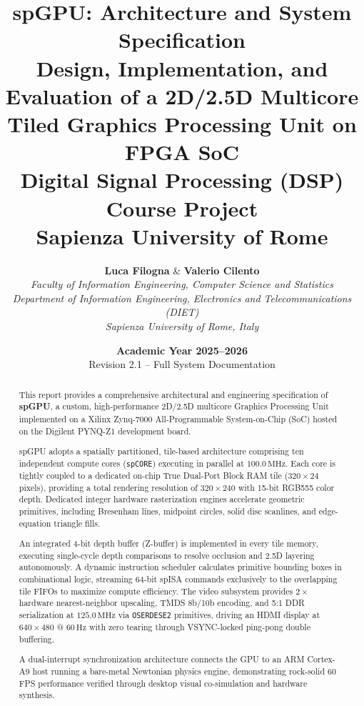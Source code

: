 \documentclass[11pt, a4paper, oneside]{report}
\title{
    \vspace{-2.0cm}
    \Huge\textbf{\color{primary}spGPU: Architecture and System Specification}\\[0.4cm]
    \LARGE\textbf{Design, Implementation, and Evaluation of a 2D/2.5D Multicore Tiled Graphics Processing Unit on FPGA SoC}\\[0.8cm]
    \large Digital Signal Processing (DSP) Course Project\\
    Sapienza University of Rome
}
\author{
    \textbf{Luca Filogna} \quad \& \quad \textbf{Valerio Cilento}\\[0.2cm]
    \textit{Faculty of Information Engineering, Computer Science and Statistics}\\
    \textit{Department of Information Engineering, Electronics and Telecommunications (DIET)}\\
    \textit{Sapienza University of Rome, Italy}
}
\date{\textbf{Academic Year 2025--2026}\\[0.4cm] \small Revision 2.1 -- Full System Documentation}
\begin{document}
\maketitle

\begin{abstract}
This report provides a comprehensive architectural and engineering specification of \textbf{spGPU}, a custom, high-performance 2D/2.5D multicore Graphics Processing Unit implemented on a Xilinx Zynq-7000 All-Programmable System-on-Chip (SoC) hosted on the Digilent PYNQ-Z1 development board. 

spGPU adopts a spatially partitioned, tile-based architecture comprising ten independent compute cores (\texttt{spCORE}) executing in parallel at $100.0\,\text{MHz}$. Each core is tightly coupled to a dedicated on-chip True Dual-Port Block RAM tile ($320 \times 24$ pixels), providing a total rendering resolution of $320 \times 240$ with 15-bit RGB555 color depth. Dedicated integer hardware rasterization engines accelerate geometric primitives, including Bresenham lines, midpoint circles, solid disc scanlines, and edge-equation triangle fills.

An integrated 4-bit depth buffer (Z-buffer) is implemented in every tile memory, executing single-cycle depth comparisons to resolve occlusion and 2.5D layering autonomously. A dynamic instruction scheduler calculates primitive bounding boxes in combinational logic, streaming 64-bit spISA commands exclusively to the overlapping tile FIFOs to maximize compute efficiency. The video subsystem provides $2\times$ hardware nearest-neighbor upscaling, TMDS 8b/10b encoding, and 5:1 DDR serialization at $125.0\,\text{MHz}$ via \texttt{OSERDESE2} primitives, driving an HDMI display at $640 \times 480$ @ $60\,\text{Hz}$ with zero tearing through VSYNC-locked ping-pong double buffering. 

A dual-interrupt synchronization architecture connects the GPU to an ARM Cortex-A9 host running a bare-metal Newtonian physics engine, demonstrating rock-solid 60 FPS performance verified through desktop visual co-simulation and hardware synthesis.
\end{abstract}

\tableofcontents
\listoffigures
\listoftables















\end{document}
